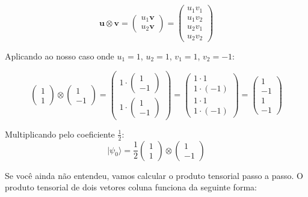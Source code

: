 \documentclass[
  brazilian,
]{report}
\begin{document}
\[\mathbf{u} \otimes \mathbf{v} = \begin{pmatrix} u_1 \mathbf{v} \\ u_2 \mathbf{v} \end{pmatrix} = \begin{pmatrix} u_1 v_1 \\ u_1 v_2 \\ u_2 v_1 \\ u_2 v_2 \end{pmatrix}\]

Aplicando ao nosso caso onde \(u_1 = 1\), \(u_2 = 1\), \(v_1 = 1\),
\(v_2 = -1\):

\[\begin{pmatrix} 1 \\ 1 \end{pmatrix} \otimes \begin{pmatrix} 1 \\ -1 \end{pmatrix} = \begin{pmatrix} 1 \cdot \begin{pmatrix} 1 \\ -1 \end{pmatrix} \\ 1 \cdot \begin{pmatrix} 1 \\ -1 \end{pmatrix} \end{pmatrix} = \begin{pmatrix} 1 \cdot 1 \\ 1 \cdot (-1) \\ 1 \cdot 1 \\ 1 \cdot (-1) \end{pmatrix} = \begin{pmatrix} 1 \\ -1 \\ 1 \\ -1 \end{pmatrix}\]

Multiplicando pelo coeficiente \(\frac{1}{2}\):
\[|\psi_0\rangle = \frac{1}{2}\begin{pmatrix} 1 \\ 1 \end{pmatrix} \otimes \begin{pmatrix} 1 \\ -1 \end{pmatrix}\]

Se você ainda não entendeu, vamos calcular o produto tensorial passo a
passo. O produto tensorial de dois vetores coluna funciona da seguinte
forma:
\end{document}
